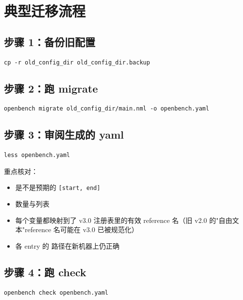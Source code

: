 \section{典型迁移流程}

\subsection{步骤 1：备份旧配置}

\begin{verbatim}
cp -r old_config_dir old_config_dir.backup
\end{verbatim}

\subsection{步骤 2：跑 migrate}

\begin{verbatim}
openbench migrate old_config_dir/main.nml -o openbench.yaml
\end{verbatim}

\subsection{步骤 3：审阅生成的 yaml}

\begin{verbatim}
less openbench.yaml
\end{verbatim}

重点核对：

\begin{itemize}
  \item {} 是不是预期的 \texttt{[start, end]}
  \item {} 数量与列表
  \item {} 每个变量都映射到了 v3.0 注册表里的有效 reference 名（旧 v2.0 的"自由文本"reference 名可能在 v3.0 已被规范化）
  \item {} 各 entry 的  路径在新机器上仍正确
\end{itemize}

\subsection{步骤 4：跑 check}

\begin{verbatim}
openbench check openbench.yaml
\end{verbatim}

